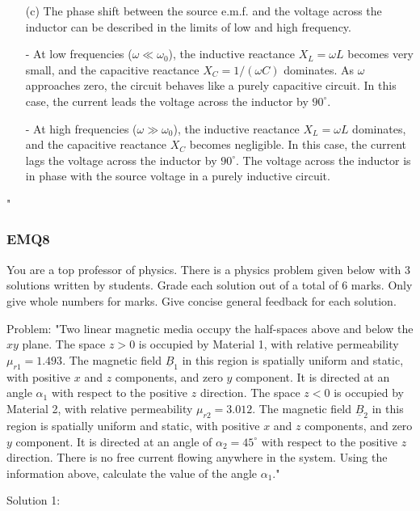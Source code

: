 \begin{enumerate}
    \item[(c)] The phase shift between the source e.m.f. and the voltage across the inductor can be described in the limits of low and high frequency.

    - At low frequencies ($\omega \ll \omega_0$), the inductive reactance $X_L = \omega L$ becomes very small, and the capacitive reactance $X_C = 1/(\omega C)$ dominates. As $\omega$ approaches zero, the circuit behaves like a purely capacitive circuit. In this case, the current leads the voltage across the inductor by $90^\circ$.
    
    - At high frequencies ($\omega \gg \omega_0$), the inductive reactance $X_L = \omega L$ dominates, and the capacitive reactance $X_C$ becomes negligible. In this case, the current lags the voltage across the inductor by $90^\circ$. The voltage across the inductor is in phase with the source voltage in a purely inductive circuit.
\end{enumerate}"

\subsubsection{EMQ8}

You are a top professor of physics. There is a physics problem given below with 3 solutions written by students. Grade each solution out of a total of 6 marks. Only give whole numbers for marks. Give concise general feedback for each solution. 

Problem:
"Two linear magnetic media occupy the half-spaces above and below the \( xy \) plane. The space \( z > 0 \) is occupied by Material 1, with relative permeability \( \mu_{r1} = 1.493 \). The magnetic field \( \underline{B}_{1} \) in this region is spatially uniform and static, with positive \( x \) and \( z \) components, and zero \( y \) component. It is directed at an angle \( \alpha_{1} \) with respect to the positive \( z \) direction. The space \( z < 0 \) is occupied by Material 2, with relative permeability \( \mu_{r2}= 3.012 \). The magnetic field \( \underline{B}_{2} \) in this region is spatially uniform and static, with positive \( x \) and \( z \) components, and zero \( y \) component. It is directed at an angle of \( \alpha_{2} = 45^\circ \) with respect to the positive \( z \) direction. There is no free current flowing anywhere in the system. Using the information above, calculate the value of the angle \( \alpha_{1} \)."

Solution 1:

